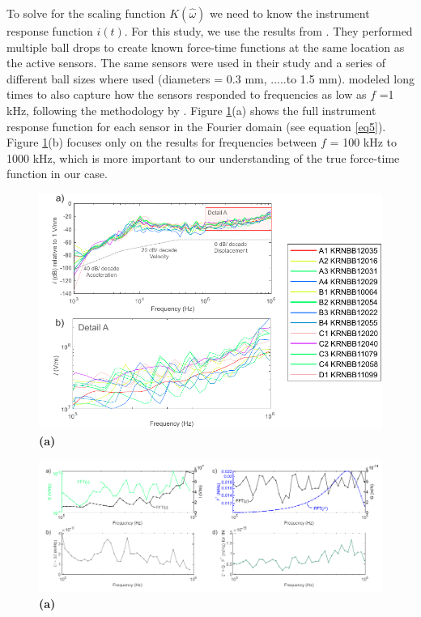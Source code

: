 \documentclass[preprint,3p, 11pt,authoryear]{elsarticle}
\begin{document}
To solve for the scaling function $K(\hat{\omega})$ we need to know the instrument response function $i(t)$. For this study, we use the results from \citet{Wu2020}. They performed multiple ball drops to create known force-time functions at the same location as the active sensors. The same sensors were used in their study and a series of different ball sizes where used (diameters = 0.3 mm, .....to 1.5 mm).  \citet{Wu2020} modeled long times to also capture how the sensors responded to frequencies as low as $f$ =1 kHz, following the methodology by \citet{Wu2018}.  Figure \ref{fig6}(a) shows the full instrument response function for each sensor in the Fourier domain (see equation \ref{eq5}).  Figure \ref{fig6}(b) focuses only on the results for frequencies between $f$ = 100 kHz to 1000 kHz, which is more important to our understanding of the true force-time function in our case.  


\begin{figure}[ht]
     	\centering
\includegraphics[scale= 0.9]{FIG6.pdf} 
\caption{\textbf{(a)}  }
	\label{fig6} 
\end{figure}


\begin{figure}[ht]
     	\centering
\includegraphics[scale= 1]{FIG7.pdf} 
\caption{\textbf{(a)}  }
	\label{fig7} 
\end{figure}
\end{document}

